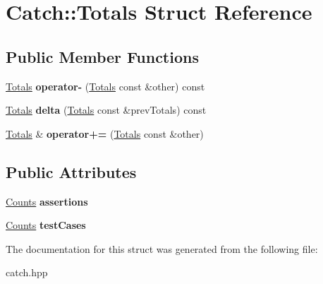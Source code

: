 \hypertarget{structCatch_1_1Totals}{
\section{Catch::Totals Struct Reference}
\label{structCatch_1_1Totals}
}
\subsection*{Public Member Functions}
\begin{DoxyCompactItemize}
\item 
\hypertarget{structCatch_1_1Totals_abe15cd8a82ba9a4868dd7a542add827c}{
\hyperlink{structCatch_1_1Totals}{Totals} {\bfseries operator-\/} (\hyperlink{structCatch_1_1Totals}{Totals} const \&other) const }
\label{structCatch_1_1Totals_abe15cd8a82ba9a4868dd7a542add827c}

\item 
\hypertarget{structCatch_1_1Totals_a3dee0f599c081a8360c0112fb1dafe8f}{
\hyperlink{structCatch_1_1Totals}{Totals} {\bfseries delta} (\hyperlink{structCatch_1_1Totals}{Totals} const \&prevTotals) const }
\label{structCatch_1_1Totals_a3dee0f599c081a8360c0112fb1dafe8f}

\item 
\hypertarget{structCatch_1_1Totals_a574015076e54cc405c70b053e3356e43}{
\hyperlink{structCatch_1_1Totals}{Totals} \& {\bfseries operator+=} (\hyperlink{structCatch_1_1Totals}{Totals} const \&other)}
\label{structCatch_1_1Totals_a574015076e54cc405c70b053e3356e43}

\end{DoxyCompactItemize}
\subsection*{Public Attributes}
\begin{DoxyCompactItemize}
\item 
\hypertarget{structCatch_1_1Totals_a885ded66df752147b30c3d45aa602ec9}{
\hyperlink{structCatch_1_1Counts}{Counts} {\bfseries assertions}}
\label{structCatch_1_1Totals_a885ded66df752147b30c3d45aa602ec9}

\item 
\hypertarget{structCatch_1_1Totals_adb195fe477aedee2ecea88c888f16506}{
\hyperlink{structCatch_1_1Counts}{Counts} {\bfseries testCases}}
\label{structCatch_1_1Totals_adb195fe477aedee2ecea88c888f16506}

\end{DoxyCompactItemize}


The documentation for this struct was generated from the following file:\begin{DoxyCompactItemize}
\item 
catch.hpp\end{DoxyCompactItemize}
